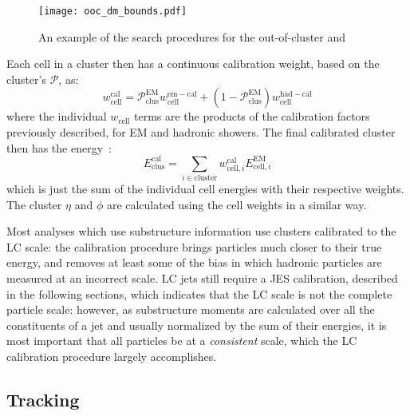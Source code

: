 
\begin{figure}
\centering
\texttt{[image: ooc\_dm\_bounds.pdf]}
\caption{An example of the search procedures for the out-of-cluster and }
\label{fig:jet-reconstruction:cluster-calibration:ooc-dm}
\end{figure}



Each cell in a cluster then has a continuous calibration weight, based on the cluster's $\mathcal{P}$, as:
%
\begin{equation}
w_\mathrm{cell}^\mathrm{cal} = \mathcal{P}^\mathrm{EM}_\mathrm{clus} w_\mathrm{cell}^\mathrm{em-cal} + (1 - \mathcal{P}_\mathrm{clus}^\mathrm{EM}) w_\mathrm{cell}^\mathrm{had-cal}
\end{equation}
%
where the individual $w_\mathrm{cell}$ terms are the products of the calibration factors previously described, for EM and hadronic showers. The final calibrated cluster then has the energy~\cite{Loch:1967028}:
%
\begin{equation}
E^\mathrm{cal}_\mathrm{clus} = \sum_{i \in \mathrm{cluster}} w_{\mathrm{cell},i}^\mathrm{cal} E_{\mathrm{cell},i}^\mathrm{EM}
\end{equation}
%
which is just the sum of the individual cell energies with their respective weights. The cluster $\eta$ and $\phi$ are calculated using the cell weights in a similar way.

Most analyses which use substructure information use clusters calibrated to the LC scale: the calibration procedure brings particles much closer to their true energy, and removes at least some of the bias in which hadronic particles are measured at an incorrect scale. LC jets still require a JES calibration, described in the following sections, which indicates that the LC scale is not the complete particle scale: however, as substructure moments are calculated over all the constituents of a jet and usually normalized by the sum of their energies, it is most important that all particles be at a \textit{consistent} scale, which the LC calibration procedure largely accomplishes.

\subsection{Tracking}
\label{tracking}

